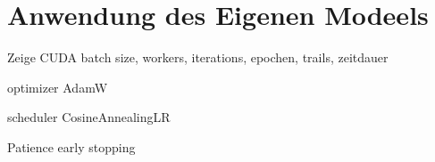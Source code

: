 \section{Anwendung des Eigenen Modeels}


\begin{frame}
    Zeige CUDA batch size, workers, iterations, epochen, trails, zeitdauer
\end{frame}

\begin{frame}{optimizer AdamW}
    
\end{frame}


\begin{frame}{scheduler CosineAnnealingLR}
    
\end{frame}


\begin{frame}{Patience early stopping}
    
\end{frame}



